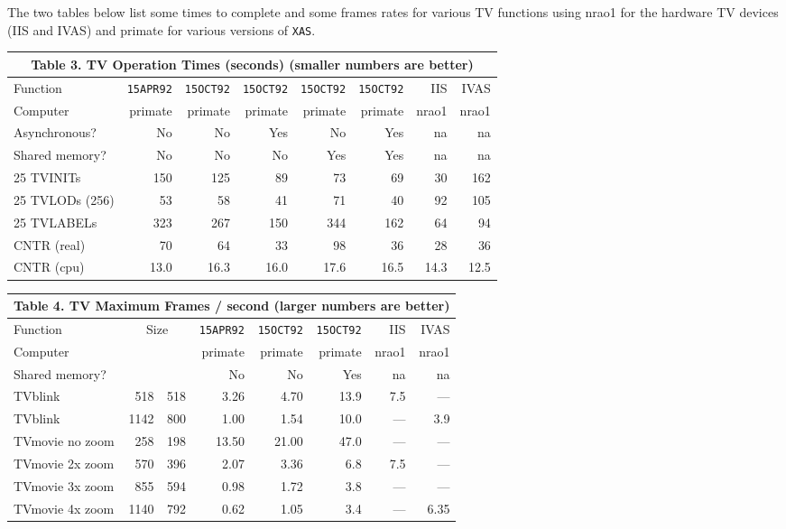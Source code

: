 The two tables below list some times to complete and some frames rates
for various TV functions using nrao1 for the hardware TV devices (IIS
and IVAS) and primate for various versions of {\tt XAS}.

\begin{center}
\begin{tabular}{lrrrrrrr}
\multicolumn{8}{c}{Table 3. \qquad TV Operation Times (seconds)\hfill
(smaller numbers are better)}\\
\hline
Function&{\tt 15APR92}&{\tt 15OCT92}&{\tt 15OCT92}&{\tt 15OCT92}&
{\tt 15OCT92}& IIS& IVAS\\
Computer      &primate&primate&primate&primate&primate&nrao1&nrao1\\
Asynchronous? & No& No& Yes&  No& Yes& na& na\\
Shared memory?& No& No&  No& Yes& Yes& na& na\\
\hline
25 TVINITs     & 150& 125&  89&  73&  69&  30& 162\\
25 TVLODs (256)&  53&  58&  41&  71&  40&  92& 105\\
25 TVLABELs    & 323& 267& 150& 344& 162&  64&  94\\
CNTR (real)    &  70&  64&  33&  98&  36&  28&  36\\
CNTR (cpu)     &13.0&16.3&16.0&17.6&16.5&14.3&12.5\\
\hline
\end{tabular}
\end{center}

\begin{center}
\begin{tabular}{lrrrrrrr}
\multicolumn{8}{c}{Table 4. \qquad TV Maximum Frames / second \hfill
(larger numbers are better)}\\
\hline
Function&\multicolumn{2}{c}{Size}&{\tt 15APR92}&{\tt 15OCT92}&
{\tt 15OCT92}& IIS& IVAS\\
Computer      &    &    &primate&primate&primate&nrao1&nrao1\\
Shared memory?&    &    &No  &No   &Yes  &na & na\\
\hline
TVblink        & 518& 518&  3.26&  4.70& 13.9& 7.5& ---\\
TVblink        &1142& 800&  1.00&  1.54& 10.0& ---& 3.9\\
TVmovie no zoom& 258& 198& 13.50& 21.00& 47.0& ---& ---\\
TVmovie 2x zoom& 570& 396&  2.07&  3.36&  6.8& 7.5& ---\\
TVmovie 3x zoom& 855& 594&  0.98&  1.72&  3.8& ---& ---\\
TVmovie 4x zoom&1140& 792&  0.62&  1.05&  3.4& ---& 6.35\\
\hline
\end{tabular}
\end{center}

